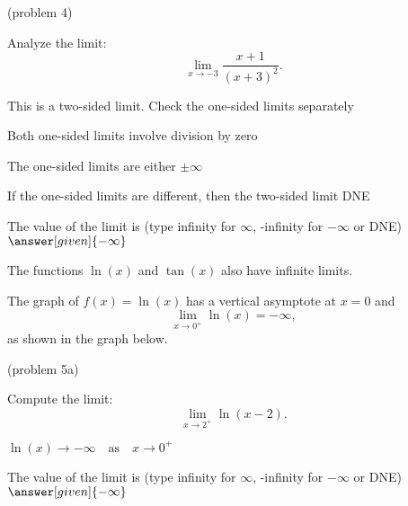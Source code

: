 \documentclass{ximera}
\begin{document}
\begin{problem}(problem 4)
  
	Analyze the limit:
  \[
  \lim_{x \to -3} \frac{x+1}{(x+3)^2}.
  \]
  
    \begin{hint}
      This is a two-sided limit. Check the one-sided limits separately
    \end{hint}
    \begin{hint}
      Both one-sided limits involve division by zero
    \end{hint}
    \begin{hint}
      The one-sided limits are either $\pm \infty$
    \end{hint}
		\begin{hint}
		  If the one-sided limits are different, then the two-sided limit DNE
		\end{hint}	
		The value of the limit is
		(type infinity for $\infty$, -infinity for $-\infty$ or DNE)
		 $\answer[given]{-\infty}$
		
\end{problem}

The functions $\ln(x)$ and $\tan(x)$ also have infinite limits.

\begin{example}[example 5]
The graph of $f(x) = \ln(x)$ has a vertical asymptote at $x=0$
and 
\[
\lim_{x\to 0^+} \ln(x) = -\infty,
\]
as shown in the graph below.


\begin{center}
\end{center}


\end{example}


\begin{problem}(problem 5a)
  
	Compute the limit:
  \[
  \lim_{x \to {2^+}} \ln(x-2).
  \]
		\begin{hint}
		  $\ln(x) \to -\infty \quad \text{as} \quad x \to 0^+$
		\end{hint}	
		The value of the limit is
		(type infinity for $\infty$, -infinity for $-\infty$ or DNE)
		 $\answer[given]{-\infty}$
		
\end{problem}
\end{document}
